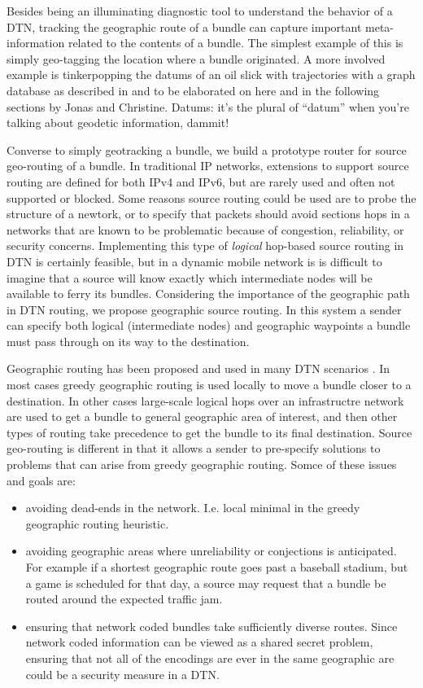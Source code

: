 \documentclass{sig-alternate}
\begin{document}
Besides being an illuminating diagnostic tool to understand the behavior of a DTN, tracking the geographic route of a bundle can capture important meta-information related to the contents of a bundle.  The simplest example of this is simply geo-tagging the location where a bundle originated.  A more involved example is tinkerpopping the datums of an oil slick with trajectories with a graph database as described in \cite{jonas-paper} and to be elaborated on here and in the following sections by Jonas and Christine.  Datums: it's the plural of ``datum'' when you're talking about geodetic information, dammit!

Converse to simply geotracking a bundle, we build a prototype router for source geo-routing of a bundle.  In traditional IP networks, extensions to support source routing are defined for both IPv4 and IPv6, but are rarely used and often not supported or blocked.  Some reasons source routing could be used are to probe the structure of a newtork, or to specify that packets should avoid sections hops in a networks that are known to be problematic because of congestion, reliability, or security concerns.  Implementing this type of {\it logical} hop-based source routing in DTN is certainly feasible, but in a dynamic mobile network is is difficult to imagine that a source will know exactly which intermediate nodes will be available to ferry its bundles.  Considering the importance of the geographic path in DTN routing, we propose geographic source routing.  In this system a sender can specify both logical (intermediate nodes) and geographic waypoints a bundle must pass through on its way to the destination.

Geographic routing has been proposed and used in many DTN scenarios \cite{paper1,paper2,paper3,paper4,paper5,paper6}.  In most cases greedy geographic routing is used locally to move a bundle closer to a destination.  In other cases large-scale logical hops over an infrastructre network are used to get a bundle to general geographic area of interest, and then other types of routing take precedence to get the bundle to its final destination.  Source geo-routing is different in that it allows a sender to pre-specify solutions to problems that can arise from greedy geographic routing.  Somce of these issues and goals are:
\begin{itemize}
  \item avoiding dead-ends in the network. I.e. local minimal in the greedy geographic routing heuristic.
  \item avoiding geographic areas where unreliability or conjections is anticipated.  For example if a shortest geographic route goes past a baseball stadium, but a game is scheduled for that day, a source may request that a bundle be routed around the expected traffic jam.
  \item ensuring that network coded bundles take sufficiently diverse routes.  Since network coded information can be viewed as a shared secret problem, ensuring that not all of the encodings are ever in the same geographic are could be a security measure in a DTN.
\end{itemize}
\end{document}
